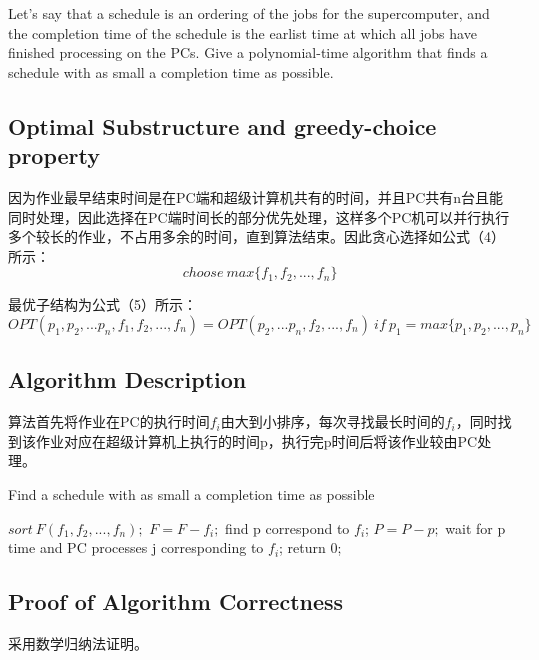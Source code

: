 \documentclass{article}
\begin{document}
Let's say that a schedule is an ordering of the jobs for the supercomputer, and the completion time of the schedule is the earlist time at which all jobs have finished processing on the PCs. Give a polynomial-time algorithm that finds a schedule with as small a completion time as possible.


\subsection{Optimal Substructure and greedy-choice property}
因为作业最早结束时间是在PC端和超级计算机共有的时间，并且PC共有n台且能同时处理，因此选择在PC端时间长的部分优先处理，这样多个PC机可以并行执行多个较长的作业，不占用多余的时间，直到算法结束。因此贪心选择如公式（4）所示：
\begin{equation}
choose\ max\{f_1,f_2,...,f_n\}
\end{equation}

最优子结构为公式（5）所示：
\begin{equation}
OPT(p_1,p_2,...p_n,f_1,f_2,...,f_n) = OPT(p_2,...p_n,f_2,...,f_n)\ if\ p_1 = max\{p_1,p_2,...,p_n\}
\end{equation} 

\subsection{Algorithm Description}
算法首先将作业在PC的执行时间$f_i$由大到小排序，每次寻找最长时间的$f_i$，同时找到该作业对应在超级计算机上执行的时间p，执行完p时间后将该作业较由PC处理。


\begin{algorithm}[htbp]  
  \caption{Find a schedule with as small a completion time as possible}  
  \begin{algorithmic}[1] 
	\State $sort\ F(f_1,f_2,...,f_n);$
	\State $F = F - f_i;$
	\State find p correspond to $f_i$;
	\State $P = P - p;$
	\State wait for p time and PC processes j corresponding to $f_i$;
	\EndFor
	\State return 0;
    \EndFunction 
  \end{algorithmic}  
\end{algorithm} 


\subsection{Proof of Algorithm Correctness}
采用数学归纳法证明。\\
\end{document}
